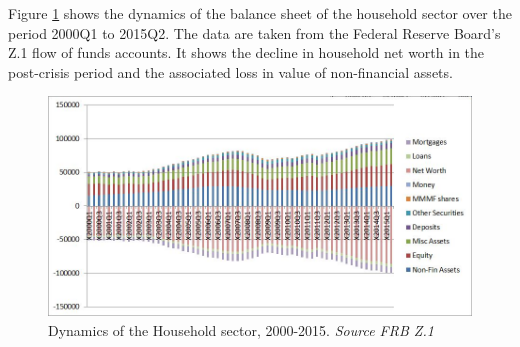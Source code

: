 \documentclass[twoside,a4paper,11pt]{article}
\begin{document}

Figure \ref{fig:hh} shows  the dynamics of the balance sheet of the household sector over the period 2000Q1 to 2015Q2. The data are taken from the Federal Reserve Board's Z.1 flow of funds accounts. It shows the decline in household net worth in the post-crisis period and the associated loss in value of non-financial assets.

\begin{figure}
  \includegraphics[width=\linewidth]{hh.jpg}
  \caption{Dynamics of the Household sector, 2000-2015. \emph{Source FRB Z.1} }
  \label{fig:hh}
\end{figure}
\end{document}
